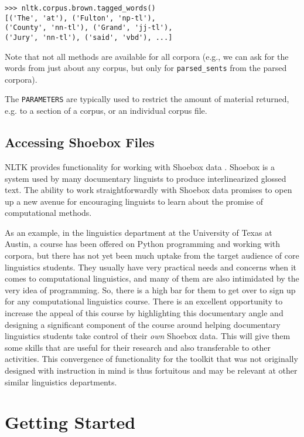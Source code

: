 \documentclass[11pt]{article}
\newcommand{\code}[1]{\texttt{\small #1}}
\begin{document}
{\small\begin{verbatim}
>>> nltk.corpus.brown.tagged_words()
[('The', 'at'), ('Fulton', 'np-tl'),
('County', 'nn-tl'), ('Grand', 'jj-tl'),
('Jury', 'nn-tl'), ('said', 'vbd'), ...]
\end{verbatim}}

Note that not all methods are available for all corpora (e.g., we can
ask for the words from just about any corpus, but only for
\code{parsed\_sents} from the parsed corpora).

The \code{PARAMETERS} are typically used to restrict the amount of material returned,
e.g. to a section of a corpus, or an individual corpus file.

\subsection{Accessing Shoebox Files}

NLTK provides functionality for working with Shoebox data
\cite{robinson:etal:2007}. Shoebox is a system used by many
documentary linguists to produce interlinearized glossed text.  The
ability to work straightforwardly with Shoebox data promises to open
up a new avenue for encouraging linguists to learn about the promise
of computational methods. 

As an example, in the linguistics department at the University of
Texas at Austin, a course has been offered on Python programming and
working with corpora, but there has not yet been much uptake from the
target audience of core linguistics students. They usually have very
practical needs and concerns when it comes to computational
linguistics, and many of them are also intimidated by the very idea of
programming. So, there is a high bar for them to get over to sign up
for any computational linguistics course. There is an excellent
opportunity to increase the appeal of this course by highlighting this
documentary angle and designing a significant component of the course
around helping documentary linguistics students take control of their
{\it own} Shoebox data. This will give them some skills that are
useful for their research and also transferable to other activities.
This convergence of functionality for the toolkit that was not
originally designed with instruction in mind is thus fortuitous and
may be relevant at other similar linguistics departments.


\section{Getting Started}
\label{sec:getting-started}
\end{document}
